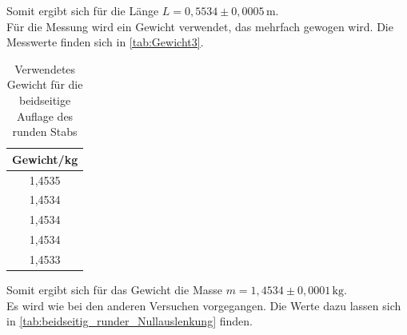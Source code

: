   Somit ergibt sich für die Länge $L = 0{,}5534 \pm 0,0005 \, \mathrm{m}$.\\

  Für die Messung wird ein Gewicht verwendet, das mehrfach gewogen wird. Die Messwerte finden sich in \autoref{tab:Gewicht3}.

  \begin{table}
    \centering
    \caption{Verwendetes Gewicht für die beidseitige Auflage des runden Stabs}
    \label{tab:Gewicht3}
    \begin{tabular}{c}
      \toprule
      Gewicht/kg \\
      \midrule
      1,4535 \\
      1,4534 \\
      1,4534 \\
      1,4534 \\
      1,4533 \\
      \bottomrule
    \end{tabular}
  \end{table}

  Somit ergibt sich für das Gewicht die Masse $m = 1{,}4534 \pm 0,0001 \, \mathrm{kg}$.\\

  Es wird wie bei den anderen Versuchen vorgegangen. Die Werte dazu lassen
  sich in \autoref{tab:beidseitig_runder_Nullauslenkung} finden.

